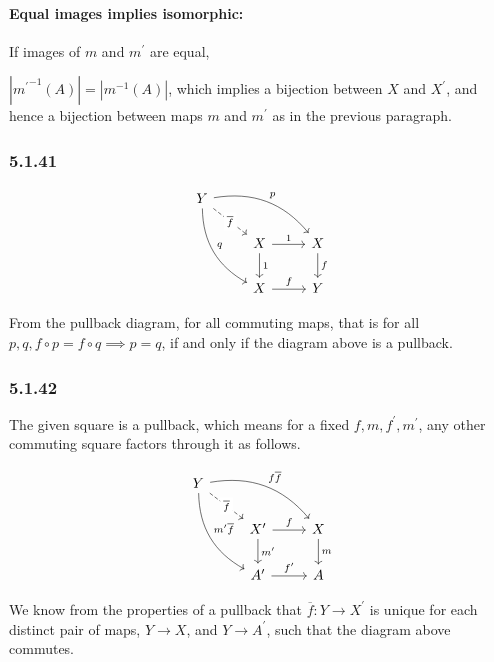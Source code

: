 \documentclass{article}
\begin{document}
\paragraph{Equal images implies isomorphic:}

If images of $m$ and $m^\prime$ are equal,

$|{m^{\prime}}^{-1}(A)| = |m^{-1}(A)|$, which implies a bijection between $X$ and $X^\prime$, and hence a bijection between maps $m$ and $m^\prime$ as in the previous paragraph.

\subsubsection*{5.1.41}

\begin{equation*}
\begin{tikzcd}
Y
\arrow[drr, bend left, "p"]
\arrow[ddr, bend right, "q"]
\arrow[dr, dashed, "\overline{f}" description] & \\
& X \arrow[r, "1"] \arrow[d, "1"]
& X \arrow[d,"f"] \\
& X \arrow[r, "f"]
& Y
\end{tikzcd}
\end{equation*}

From the pullback diagram, for all commuting maps, that is for all
$p, q, f \circ p = f \circ q \implies p = q$, if and only if the diagram above is a pullback.

\subsubsection*{5.1.42}

The given square is a pullback, which means for a fixed $f,m,f^\prime,m^\prime$, any other commuting square factors through it as follows.

\begin{equation*}
\begin{tikzcd}
Y
\arrow[drr, bend left, "f \overline{f}"]
\arrow[ddr, bend right, "m^\prime\overline{f}"]
\arrow[dr, dashed, "\overline{f}" description] & \\
& X^\prime \arrow[r, "f"] \arrow[d, "m^\prime"]
& X \arrow[d,"m"] \\
& A^\prime \arrow[r, "f^\prime"]
& A
\end{tikzcd}
\end{equation*}

We know from the properties of a pullback that $\overline{f}: Y \rightarrow X^\prime$ is unique for each distinct pair of maps, $Y \rightarrow X$, and $Y \rightarrow A^\prime$, such that the diagram above commutes.
\end{document}
